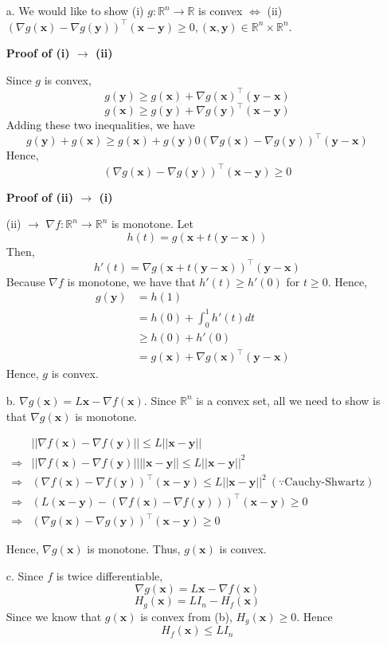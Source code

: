 \documentclass[11pt]{article}
\theoremstyle{remark}
\newcommand{\R}{\mathbb{R}}                     %
\newcommand{\bx}{\mathbf{x}}
\newcommand{\by}{\mathbf{y}}
\begin{document}
\color{blue}
\begin{itemize}
\item[a.] We would like to show (i) $g: \R^n \rightarrow \R$ is convex $\Leftrightarrow$ (ii) $(\nabla g(\bx)-\nabla g(\by))^\intercal (\bx-\by) \geq 0, (\bx,\by)\in \R^n \times \R^n$.

\textbf{Proof of (i) $\rightarrow$ (ii)}

Since $g$ is convex,
$$g(\by) \geq g(\bx) + \nabla g(\bx)^\intercal (\by-\bx)$$
$$g(\bx) \geq g(\by) + \nabla g(\by)^\intercal (\bx-\by)$$
Adding these two inequalities, we have
$$g(\by) + g(\bx) \geq g(\bx) + g(\by) 0 (\nabla g(\bx)-\nabla g(\by))^\intercal (\by-\bx)$$
Hence,
$$(\nabla g(\bx)-\nabla g(\by))^\intercal (\bx-\by) \geq 0$$

\textbf{Proof of (ii) $\rightarrow$ (i)}

(ii) $\rightarrow$ $\nabla f: \R^n \rightarrow \R^n$ is monotone. Let $$h(t) = g(\bx+t(\by-\bx))$$ Then, $$h'(t) = \nabla g(\bx+t(\by-\bx))^\intercal (\by-\bx)$$
Because $\nabla f$ is monotone, we have that $h'(t) \geq h'(0)$ for $t\geq 0$. Hence, 
\begin{align*}
g(\by) &= h(1) &\\
&= h(0)+\int_0^1 h'(t)dt &\\
&\geq h(0)+h'(0) &\\
&= g(\bx) + \nabla g(\bx)^\intercal (\by-\bx)
\end{align*}
Hence, $g$ is convex.

\item[b.]
$\nabla g(\bx)= L\bx - \nabla f(\bx)$. Since $\R^n$ is a convex set, all we need to show is that $\nabla g(\bx)$ is monotone. 

\begin{align*}
& ||\nabla f(\bx)-\nabla f(\by)|| \leq L||\bx-\by|| &\\
\Rightarrow& ||\nabla f(\bx)-\nabla f(\by)||||\bx-\by||  \leq L||\bx-\by||^2 &\\
\Rightarrow& (\nabla f(\bx)-\nabla f(\by))^\intercal (\bx-\by)  \leq L||\bx-\by||^2 \ (\because \text{Cauchy-Shwartz}) &\\
\Rightarrow& (L(\bx-\by) -(\nabla f(\bx)-\nabla f(\by)))^\intercal (\bx-\by)  \geq 0 &\\
\Rightarrow& (\nabla g(\bx)-\nabla g(\by))^\intercal (\bx-\by)  \geq 0 
\end{align*}

Hence, $\nabla g(\bx)$ is monotone. Thus, $g(\bx)$ is convex.

\item[c.]
Since $f$ is twice differentiable,
$$\nabla g(\bx) = L\bx - \nabla f(\bx)$$
$$H_g(\bx) = LI_n - H_f(\bx)$$
Since we know that $g(\bx)$ is convex from (b), $H_g(\bx) \geq 0$. Hence
$$H_f(\bx) \leq LI_n$$
\end{itemize}
\color{black}
\end{document}
